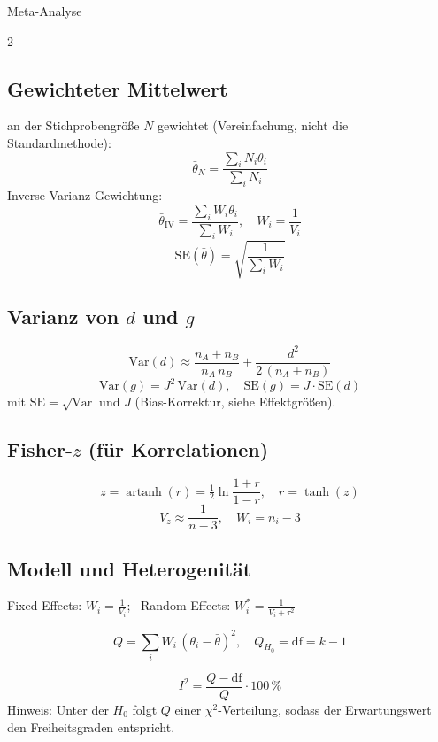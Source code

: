 \begin{formulaBox}{Meta-Analyse}{}
\begin{multicols}{2}
\subsection*{Gewichteter Mittelwert}
an der Stichprobengröße $N$ gewichtet (Vereinfachung, nicht die Standardmethode):
$$\bar{\theta}_N = \frac{\sum_{i} N_i \theta_i}{\sum_{i} N_i}$$
Inverse-Varianz-Gewichtung:
$$\bar{\theta}_{\mathrm{IV}} = \frac{\sum_i W_i \theta_i}{\sum_i W_i}, \quad W_i = \frac{1}{V_i}$$
$$\mathrm{SE}(\bar{\theta}) = \sqrt{\frac{1}{\sum_i W_i}}$$

\subsection*{Varianz von $d$ und $g$}
$$\mathrm{Var}(d) \approx \frac{n_A+n_B}{n_A\, n_B} + \frac{d^2}{2\,(n_A+n_B)}$$
$$\mathrm{Var}(g) = J^2\,\mathrm{Var}(d), \quad \mathrm{SE}(g) = J\cdot\mathrm{SE}(d)$$
mit $\mathrm{SE}=\sqrt{\mathrm{Var}}$ und $J$ (Bias-Korrektur, siehe Effektgrößen).

\subsection*{Fisher-$z$ (für Korrelationen)}
$$z = \operatorname{artanh}(r) = \tfrac{1}{2}\ln\frac{1+r}{1-r}, \quad r = \tanh(z)$$
$$V_z \approx \frac{1}{n-3}, \quad W_i = n_i - 3$$

\subsection*{Modell und Heterogenität}
Fixed-Effects: $W_i = \frac{1}{V_i}$; \ Random-Effects: $W_i^{*} = \frac{1}{V_i+\tau^2}$

$$Q = \sum_i W_i\,(\theta_i - \bar{\theta})^2, \quad Q_{H_0} = \mathrm{df}=k-1$$

$$I^2 = \frac{Q-\mathrm{df}}{Q}\cdot 100\,\%$$
Hinweis: Unter der $H_0$ folgt $Q$ einer $\chi^2$-Verteilung, sodass der Erwartungswert den Freiheitsgraden entspricht.
\end{multicols}
\end{formulaBox}
